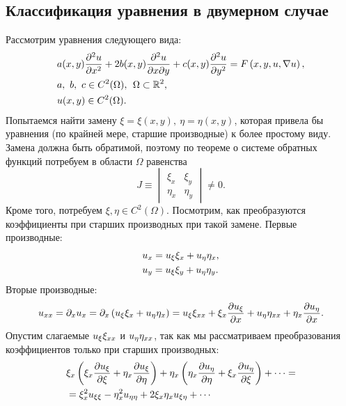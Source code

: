 \subsection{Классификация уравнения в двумерном случае}
    Рассмотрим уравнения следующего вида:
    \begin{align}
        & a(x, y)\frac{\partial^2u}{\partial{x}^2} + 2b(x,y)\frac{\partial^2u}{\partial x\partial y} + c(x, y)\frac{\partial^2u}{\partial{y}^2} = F\left({x, y, u, \nabla u}\right), \label{lin2} \\
        & a,\ b,\ c \in  C^2(\Omega), \:\: \Omega \subset \mathbb{R}^2, \notag \\
        & u(x,y) \in C^2(\Omega). \notag
    \end{align}
    Попытаемся найти замену $\xi = \xi(x, y),\ \eta = \eta(x, y)$, которая привела бы уравнения (по крайней мере, старшие производные) к более простому виду.
    Замена должна быть обратимой, поэтому по теореме о системе обратных функций потребуем в области $\Omega$ равенства
    \begin{equation*}
        J \equiv \begin{vmatrix}
            \xi_x & \xi_y \\
            \eta_x & \eta_y
        \end{vmatrix}
        \not= 0.
    \end{equation*}
    Кроме того, потребуем $\xi,\eta \in C^2(\Omega)$. Посмотрим, как преобразуются коэффициенты при старших производных при
    такой замене. Первые производные:
    \begin{align*}
        & u_x = u_{\xi}\xi_x + u_{\eta} \eta_x,\\
        & u_y = u_{\xi}\xi_y + u_{\eta} \eta_y.
    \end{align*}
    Вторые производные:
    \begin{equation*}
        u_{xx} = \partial_x u_x = \partial_x\left({u_{\xi}\xi_x + u_{\eta} \eta_x}\right) = u_{\xi} \xi_{xx} + \xi_x\frac{\partial u_{\xi}}{\partial x} + 
        u_{\eta} \eta_{xx} + \eta_x \frac{\partial u_{\eta}}{\partial x}.
    \end{equation*}
    Опустим слагаемые $ u_{\xi} \xi_{xx} $ и $ u_{\eta} \eta_{xx} $, так как мы рассматриваем преобразования коэффициентов только при старших
    производных:
    \begin{align*}
        & \xi_x\left({\xi_x \frac{\partial u_{\xi}}{\partial\xi} + \eta_x \frac{\partial u_{\xi}}{\partial\eta}}\right) + \eta_x\left({\eta_x\frac{\partial u_{\eta}}{\partial\eta} + \xi_x \frac{\partial u_{\eta}}{\partial\xi}}\right) + \cdots = \\
        & = \xi_x^2 u_{\xi\xi} - \eta_x^2u_{\eta\eta} + 2\xi_x\eta_x u_{\xi\eta} + \cdots
    \end{align*}
